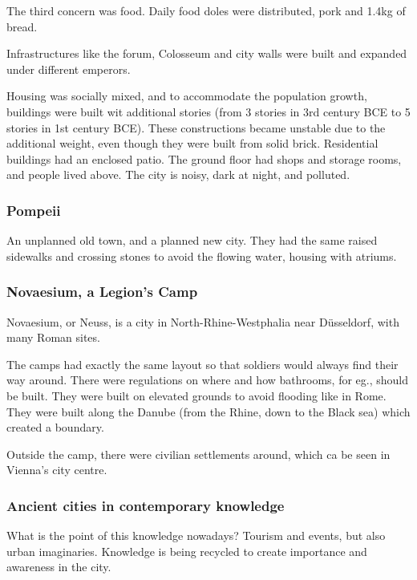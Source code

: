 \documentclass{article}
\begin{document}
The third concern was food. Daily food doles were distributed, pork and 1.4kg of bread. 

Infrastructures like the forum, Colosseum and city walls were built and expanded under different emperors. 

Housing was socially mixed, and to accommodate the population growth, buildings were built wit additional stories (from 3 stories in 3rd century BCE to 5 stories in 1st century BCE). These constructions became unstable due to the additional weight, even though they were built from solid brick.
Residential buildings had an enclosed patio. The ground floor had shops and storage rooms, and people lived above.
The city is noisy, dark at night, and polluted.

\subsubsection{Pompeii}

An unplanned old town, and a planned new city. They had the same raised sidewalks and crossing stones to avoid the flowing water, housing with atriums.

\subsubsection{Novaesium, a Legion's Camp}

Novaesium, or Neuss, is a city in North-Rhine-Westphalia near Düsseldorf, with many Roman sites.

The camps had exactly the same layout so that soldiers would always find their way around. There were regulations on where and how bathrooms, for eg., should be built.
They were built on elevated grounds to avoid flooding like in Rome. They were built along the Danube (from the Rhine, down to the Black sea) which created a boundary. 

Outside the camp, there were civilian settlements around, which ca be seen in Vienna's city centre.

\subsubsection{Ancient cities in contemporary knowledge}

What is the point of this knowledge nowadays? Tourism and events, but also urban imaginaries. Knowledge is being recycled to create importance and awareness in the city.

\end{document}
